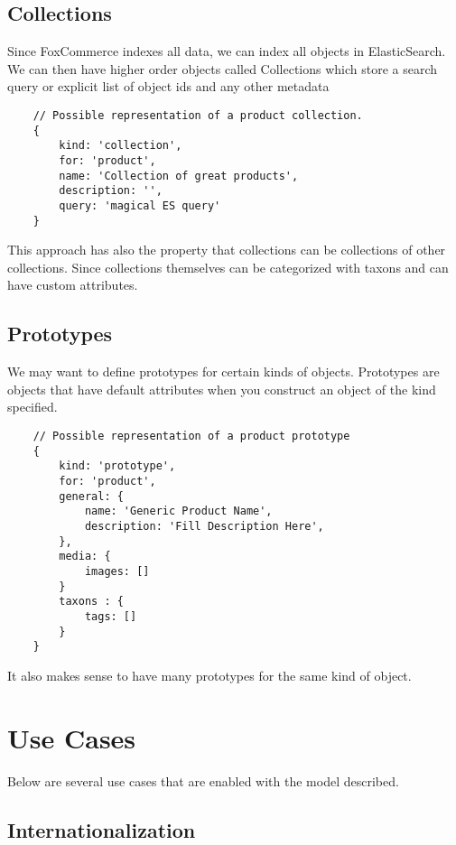 \documentclass[11pt]{article}
\begin{document}
\newpage
\subsection{Collections}

Since FoxCommerce indexes all data, we can index all objects in ElasticSearch.
We can then have higher order objects called Collections which store a search
query or explicit list of object ids and any other metadata

\begin{lstlisting}
    // Possible representation of a product collection.
    {
        kind: 'collection',
        for: 'product',
        name: 'Collection of great products',
        description: '',
        query: 'magical ES query'
    }
\end{lstlisting}

This approach has also the property that collections can be collections of other
collections. Since collections themselves can be categorized with taxons and can
have custom attributes.

\subsection{Prototypes}

We may want to define prototypes for certain kinds of objects. Prototypes are
objects that have default attributes when you construct an object of the kind specified.

\begin{lstlisting}
    // Possible representation of a product prototype
    {
        kind: 'prototype',
        for: 'product',
        general: {
            name: 'Generic Product Name',
            description: 'Fill Description Here',
        },
        media: {
            images: []
        }
        taxons : { 
            tags: []
        }
    }
\end{lstlisting}

It also makes sense to have many prototypes for the same kind of object.


\section{Use Cases}

Below are several use cases that are enabled with the model described.

\subsection{Internationalization}
\end{document}
